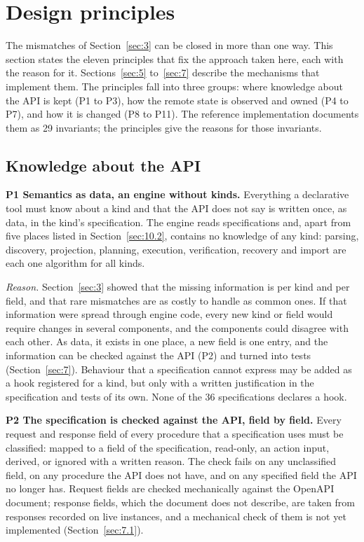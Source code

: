 \section{Design principles}\label{sec:4}

The mismatches of Section~\ref{sec:3} can be closed in more than one way. This section states the eleven
principles that fix the approach taken here, each with the reason for it. Sections~\ref{sec:5} to~\ref{sec:7} describe the
mechanisms that implement them. The principles fall into three groups: where knowledge about the API
is kept (P1 to P3), how the remote state is observed and owned (P4 to P7), and how it is changed
(P8 to P11). The reference implementation documents them as 29 invariants; the principles give the reasons
for those invariants.

\subsection{Knowledge about the API}\label{sec:4.1}

\textbf{P1 Semantics as data, an engine without kinds.} Everything a declarative tool must know about a
kind and that the API does not say is written once, as data, in the kind's specification. The engine
reads specifications and, apart from five places listed in Section~\ref{sec:10.2}, contains no knowledge of
any kind: parsing, discovery, projection, planning,
execution, verification, recovery and import are each one algorithm for all kinds.

\emph{Reason.} Section~\ref{sec:3} showed that the missing information is per kind and per field, and that rare
mismatches are as costly to handle as common ones. If that information were spread through engine
code, every new kind or field would require changes in several components, and the components
could disagree with each other. As data, it exists in one place, a new field is one entry, and the
information can be checked against the API (P2) and turned into tests (Section~\ref{sec:7}). Behaviour that a
specification cannot express may be added as a hook registered for a kind, but only with a written
justification in the specification and tests of its own. None of the 36 specifications declares a
hook.

\textbf{P2 The specification is checked against the API, field by field.} Every request and response field
of every procedure that a specification uses must be classified: mapped to a field of the
specification, read-only, an action input, derived, or ignored with a written reason. The check fails
on any unclassified field, on any procedure the API does not have, and on any specified field the
API no longer has. Request fields are checked mechanically against the OpenAPI document; response fields, which the
document does not describe, are taken from responses recorded on live instances, and a mechanical
check of them is not yet implemented (Section~\ref{sec:7.1}).


